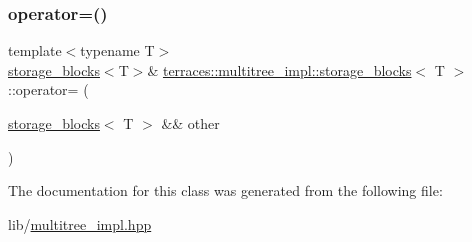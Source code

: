 \mbox{\label{classterraces_1_1multitree__impl_1_1storage__blocks_a4383b9fbd6c066f8df3f9b892a4e464e}} 
\subsubsection{\texorpdfstring{operator=()}{operator=()}\hspace{0.1cm}{\footnotesize\ttfamily [2/2]}}
{\footnotesize\ttfamily template$<$typename T$>$ \\
\hyperlink{classterraces_1_1multitree__impl_1_1storage__blocks}{storage\+\_\+blocks}$<$T$>$\& \hyperlink{classterraces_1_1multitree__impl_1_1storage__blocks}{terraces\+::multitree\+\_\+impl\+::storage\+\_\+blocks}$<$ T $>$\+::operator= (\begin{DoxyParamCaption}\item[{\hyperlink{classterraces_1_1multitree__impl_1_1storage__blocks}{storage\+\_\+blocks}$<$ T $>$ \&\&}]{other }\end{DoxyParamCaption})\hspace{0.3cm}{\ttfamily [default]}}



The documentation for this class was generated from the following file\+:\begin{DoxyCompactItemize}
\item 
lib/\hyperlink{multitree__impl_8hpp}{multitree\+\_\+impl.\+hpp}\end{DoxyCompactItemize}
